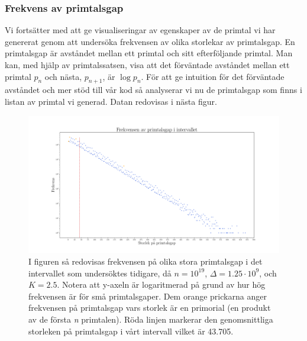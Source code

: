 \subsubsection{Frekvens av primtalsgap}

Vi fortsätter med att ge visualiseringar av egenskaper av de primtal vi har genererat genom att undersöka frekvensen av olika storlekar av primtalsgap. 
En primtalsgap är avståndet mellan ett primtal och sitt efterföljande primtal.
Man kan, med hjälp av primtalssatsen, visa att det förväntade avståndet mellan ett primtal \(p_n\) och nästa, \(p_{n+1}\), är \(\log p_n\).
För att ge intuition för det förväntade avståndet och mer stöd till vår kod så analyserar vi nu de primtalsgap som finns i listan av primtal vi generad. Datan redovisas i nästa figur.

\begin{figure}
    \centering
    \includegraphics[width = \textwidth]{coen/Images/GapsNoKapps.pdf}
    \caption{I figuren så redovisas frekvensen på olika stora primtalsgap i det intervallet som undersöktes tidigare, då \(n = 10^{19}\), \(\Delta = 1.25\cdot10^{9}\), och \(K = 2.5\). Notera att y-axeln är logaritmerad på grund av hur hög frekvensen är för små primtalsgaper. 
    Dem orange prickarna anger frekvensen på primtalsgap vars storlek är en primorial (en produkt av de första \textit{n} primtalen).
    Röda linjen markerar den genomsnittliga storleken på primtalsgap i vårt intervall vilket är 43.705.}
    \label{fig:res.gap}
\end{figure}

